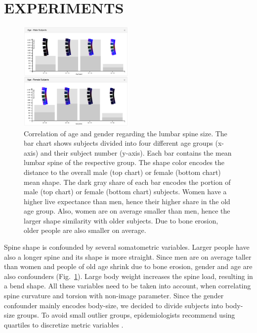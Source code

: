 \documentclass[a4paper,twoside]{style/article}
\begin{document}
\section{\uppercase{Experiments}}
\label{sec:Experiments}
\begin{figure}[!h]
  \centering
  \includegraphics[width=0.5\textwidth]{figures/age-gender}
  \caption{
	Correlation of age and gender regarding the lumbar spine size.
	The bar chart shows subjects divided into four different age groups (x-axis) and their subject number (y-axis).
	Each bar contains the mean lumbar spine of the respective group.
	The shape color encodes the distance to the overall male (top chart) or female (bottom chart) mean shape.
	The dark gray share of each bar encodes the portion of male (top chart) or female (bottom chart) subjects.
	Women have a higher live expectance than men, hence their higher share in the old age group.
	Also, women are on average smaller than men, hence the larger shape similarity with older subjects.
	Due to bone erosion, older people are also smaller on average.
	}
  \label{fig:age-gender}
\end{figure}
\noindent Spine shape is confounded by several somatometric variables.
Larger people have also a longer spine and its shape is more straight.
Since men are on average taller than women and people of old age shrink due to bone erosion, gender and age are also confounders (Fig.~\ref{fig:age-gender}).
Large body weight increases the spine load, resulting in a bend shape.
All these variables need to be taken into account, when correlating spine curvature and torsion with non-image parameter.
Since the gender confounder mainly encodes body-size, we decided to divide subjects into body-size groups.
To avoid small outlier groups, epidemiologists recommend using quartiles to discretize metric variables \cite{Klemm2014VIS}.
\end{document}
